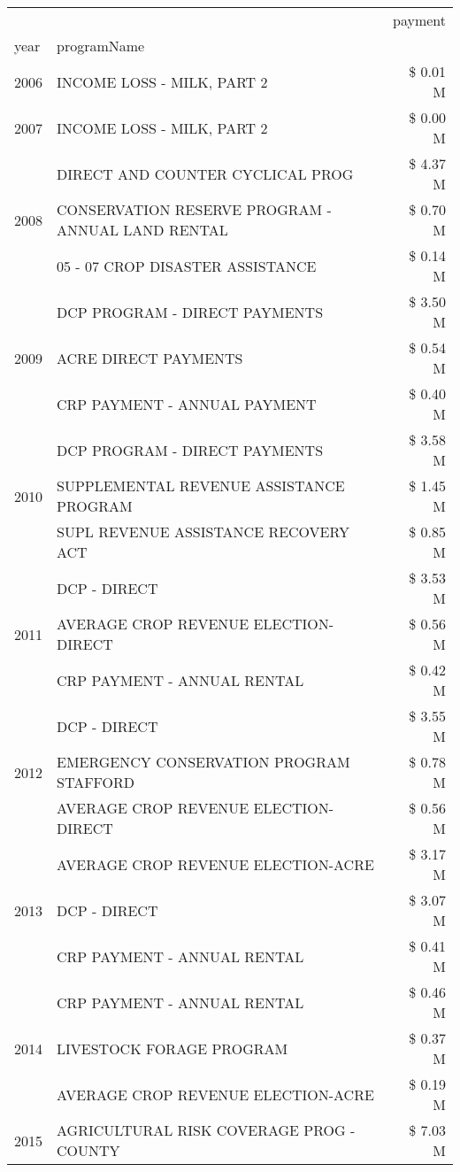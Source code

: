 \begin{tabular}{llr}
\toprule
 &  & payment \\
year & programName &  \\
\midrule
2006 & INCOME LOSS - MILK, PART 2 & \$ 0.01 M \\
\cline{1-3}
2007 & INCOME LOSS - MILK, PART 2 & \$ 0.00 M \\
\cline{1-3}
\multirow[t]{3}{*}{2008} & DIRECT AND COUNTER CYCLICAL PROG & \$ 4.37 M \\
 & CONSERVATION RESERVE PROGRAM - ANNUAL LAND RENTAL & \$ 0.70 M \\
 & 05 - 07 CROP DISASTER ASSISTANCE & \$ 0.14 M \\
\cline{1-3}
\multirow[t]{3}{*}{2009} & DCP PROGRAM - DIRECT PAYMENTS & \$ 3.50 M \\
 & ACRE DIRECT PAYMENTS & \$ 0.54 M \\
 & CRP PAYMENT - ANNUAL PAYMENT & \$ 0.40 M \\
\cline{1-3}
\multirow[t]{3}{*}{2010} & DCP PROGRAM - DIRECT PAYMENTS & \$ 3.58 M \\
 & SUPPLEMENTAL REVENUE ASSISTANCE PROGRAM & \$ 1.45 M \\
 & SUPL REVENUE ASSISTANCE RECOVERY ACT & \$ 0.85 M \\
\cline{1-3}
\multirow[t]{3}{*}{2011} & DCP - DIRECT & \$ 3.53 M \\
 & AVERAGE CROP REVENUE ELECTION-DIRECT & \$ 0.56 M \\
 & CRP PAYMENT - ANNUAL RENTAL & \$ 0.42 M \\
\cline{1-3}
\multirow[t]{3}{*}{2012} & DCP - DIRECT & \$ 3.55 M \\
 & EMERGENCY CONSERVATION PROGRAM STAFFORD & \$ 0.78 M \\
 & AVERAGE CROP REVENUE ELECTION-DIRECT & \$ 0.56 M \\
\cline{1-3}
\multirow[t]{3}{*}{2013} & AVERAGE CROP REVENUE ELECTION-ACRE & \$ 3.17 M \\
 & DCP - DIRECT & \$ 3.07 M \\
 & CRP PAYMENT - ANNUAL RENTAL & \$ 0.41 M \\
\cline{1-3}
\multirow[t]{3}{*}{2014} & CRP PAYMENT - ANNUAL RENTAL & \$ 0.46 M \\
 & LIVESTOCK FORAGE PROGRAM & \$ 0.37 M \\
 & AVERAGE CROP REVENUE ELECTION-ACRE & \$ 0.19 M \\
\cline{1-3}
\multirow[t]{3}{*}{2015} & AGRICULTURAL RISK COVERAGE PROG - COUNTY & \$ 7.03 M \\

\end{tabular}
